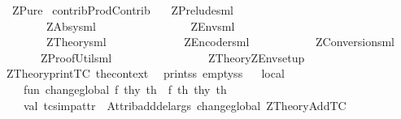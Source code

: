%
\begin{isabellebody}%
\def\isabellecontext{ZPure}%
%
\isamarkuptrue%
%
\isadelimtheory
%
\endisadelimtheory
%
\isatagtheory
{}\isamarkupfalse%
\ \ ZPure\isanewline
{}\ {\isachardoublequoteopen}contrib{\isacharslash}ProdContrib{\isachardoublequoteclose}\isanewline
{}\ \ \ {\isachardoublequoteopen}ZPrelude{\isachardot}sml{\isachardoublequoteclose}\ \ \ \ \ \ \isanewline
\ \ \ \ \ \ \ \ {\isachardoublequoteopen}ZAbsy{\isachardot}sml{\isachardoublequoteclose}\ \ \ \ \ \ \ \ \isanewline
\ \ \ \ \ \ \ \ {\isachardoublequoteopen}ZEnv{\isachardot}sml{\isachardoublequoteclose}\ \ \ \ \ \ \ \ \ \isanewline
\ \ \ \ \ \ \ \ {\isachardoublequoteopen}ZTheory{\isachardot}sml{\isachardoublequoteclose}\ \ \ \ \ \ \isanewline
\ \ \ \ \ \ \ {\isacharparenleft}{\isachardoublequoteopen}ZEncoder{\isachardot}sml{\isachardoublequoteclose}{\isacharparenright}\ \ \ \ \isanewline
\ \ \ \ \ \ \ {\isacharparenleft}{\isachardoublequoteopen}ZConversion{\isachardot}sml{\isachardoublequoteclose}{\isacharparenright}\ \isanewline
\ \ \ \ \ \ \ {\isacharparenleft}{\isachardoublequoteopen}ZProofUtil{\isachardot}sml{\isachardoublequoteclose}{\isacharparenright}\ \ \ \isanewline
\ \ \ \ \ \ \ \ \isanewline
{}%
\endisatagtheory
{\isafoldtheory}%
%
\isadelimtheory
%
\endisadelimtheory
%
\isamarkuptrue%
%
\isadelimML
\ \ \ %
\endisadelimML
%
\isatagML
{}\isamarkupfalse%
\ {\isachardoublequoteopen}ZTheory{\isachardot}ZEnv{\isacharunderscore}setup{\isachardoublequoteclose}\ \ \isanewline
\isanewline
\isanewline
{}\isamarkupfalse%
{\isacharverbatimopen}\ ZTheory{\isachardot}print{\isacharunderscore}TC\ {\isacharparenleft}the{\isacharunderscore}context{\isacharparenleft}{\isacharparenright}{\isacharparenright}\ {\isacharverbatimclose}\isanewline
{}\isamarkupfalse%
{\isacharverbatimopen}\ print{\isacharunderscore}ss\ empty{\isacharunderscore}ss\ {\isacharverbatimclose}\isanewline
\isanewline
{}\isamarkupfalse%
\ {\isacharverbatimopen}\isanewline
local\isanewline
\ \ \ \ fun\ change{\isacharunderscore}global\ f\ {\isacharparenleft}thy{\isacharcomma}\ th{\isacharparenright}\ {\isacharequal}\ {\isacharparenleft}f\ {\isacharbrackleft}th{\isacharbrackright}\ thy{\isacharcomma}\ th{\isacharparenright}{\isacharsemicolon}\isanewline
\ \ \ \ val\ tc{\isacharunderscore}simp{\isacharunderscore}attr\ {\isacharequal}\ {\isacharparenleft}Attrib{\isachardot}add{\isacharunderscore}del{\isacharunderscore}args\ {\isacharparenleft}change{\isacharunderscore}global\ ZTheory{\isachardot}Add{\isacharunderscore}TC{\isacharparenright}\ \isanewline

\end{isabellebody}
